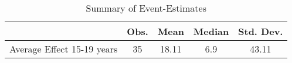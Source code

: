 \begin{table}[htbp]\centering
\def\sym#1{\ifmmode^{#1}\else\(^{#1}\)\fi}
\caption{Summary of Event-Estimates}
\begin{tabular}{l*{1}{cccc}}
\toprule
                    &        Obs.&        Mean&      Median&   Std. Dev.\\
\midrule
Average Effect 15-19 years&          35&       18.11&         6.9&       43.11\\
\bottomrule
\end{tabular}
\end{table}
